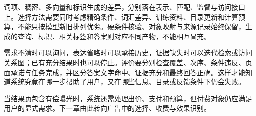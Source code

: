 词项、稠密、多向量和标识生成的差异，分别落在表示、匹配、监督与访问接口上。选择方法需要同时考虑精确条件、词汇差异、训练资料、目录更新和计算预算，不能只按模型新旧排列优劣。硬条件核验、对象映射与来源记录始终保留，生成的查询、标识、相关标签和答案则对应不同产物，不能相互冒充。

需求不清时可以询问，表达省略时可以承接历史，证据缺失时可以迭代检索或访问关系图；已有充分结果时也可以停止。评价要分别检查覆盖、次序、条件违反、页面承诺与任务完成，并区分答案文字命中、证据充分和最终回答正确。这样才能知道系统究竟在哪一步帮助了用户，又在哪些信息、目录或反馈条件下仍会失败。

当结果页包含有偿曝光时，系统还需处理出价、支付和预算，但付费对象仍应满足用户的显式需求。下一章由此转向广告中的选择、收费与效果识别。
